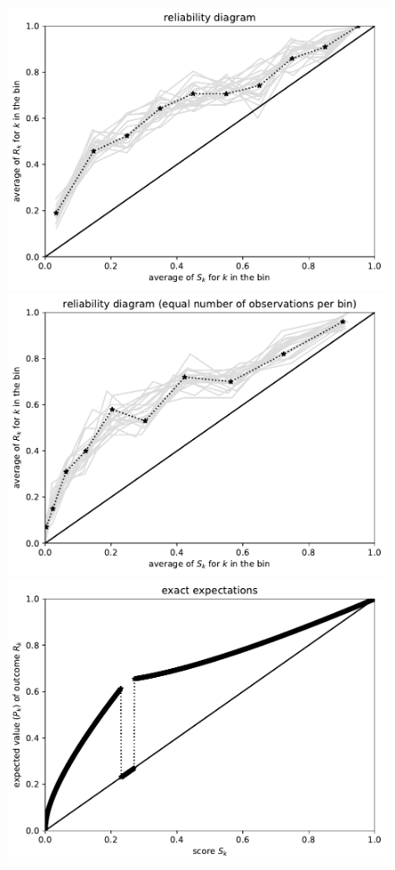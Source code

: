 \documentclass{article}
\begin{document}
\begin{figure}
\begin{centering}
\parbox{\imsize}{\includegraphics[width=\imsize]
                {./codes/unweighted/1000_10_1_2/equiprob.pdf}}
\quad\quad
\parbox{\imsize}{\includegraphics[width=\imsize]
                {./codes/unweighted/1000_10_1_2/equisamp.pdf}}

\vspace{\vertsep}

\parbox{\imsize}{\includegraphics[width=\imsize]
                {./codes/unweighted/1000_10_1_2/exact.pdf}}


\end{centering}
\end{figure}
\end{document}
